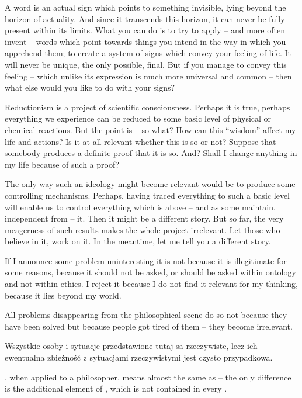 
\pa
A word is an actual sign which points to something invisible, lying
beyond the horizon of actuality. And since it transcends this horizon,
it can never be fully present within its limits. What you can do is to
try to apply -- and more often invent -- words which point towards
things you intend in the way in which you apprehend them; to create a
system of signs which convey your feeling of life. It will never be
unique, the only possible, final. But if you manage to convey this
feeling -- which unlike its expression is much more universal and
common -- then what else would you like to do with your signs?

\pa
Reductionism is a project of scientific consciousness. Perhaps it is
true, perhaps everything we experience can be reduced to some basic
level of physical or chemical reactions. But the point is -- so what?
How can this ``wisdom'' affect my life and actions? Is it at all
relevant whether this is so or not? Suppose that somebody produces a
definite proof that it is so. And? Shall I change anything in my life
because of such a proof?

The only way such an ideology might become relevant would be to
produce some controlling mechanisms.  Perhaps, having traced everything
to such a basic level will enable us to control everything which is
above -- and as some maintain, independent from -- it. Then it might
be a different story. But so far, the very meagerness of such results
makes the whole project irrelevant. Let those who believe in it, work
on it. In the meantime, let me tell you a different story.

\pa
If I announce some problem uninteresting it is not because it is
illegitimate for some reasons, because it should not be asked, or 
should be asked within 
ontology and not within ethics. I reject it because I do not find 
it relevant for my thinking, because it lies beyond my world.

All problems disappearing from the philosophical scene do so not because they 
have been solved but because people got tired of them -- they become 
irrelevant.

\pa
Wszystkie osoby i sytuacje przedstawione tutaj sa\; rzeczywiste, lecz
ich ewentualna zbie\.zno\'s\'c z sytuacjami rzeczywistymi jest czysto przypadkowa.


\pa
{}, when applied to a philosopher, means almost the same as
 -- the only difference is the additional element of ,
which is not contained in every .

